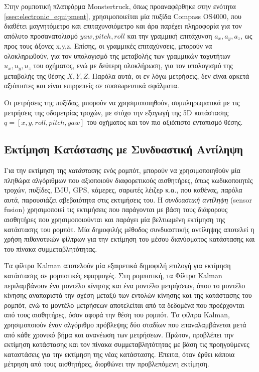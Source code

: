 \bigskip
Στην ρομποτική πλατφόρμα {Monstertruck}, όπως προαναφέρθηκε στην ενότητα \ref{ssec:electronic_equipment}, χρησιμοποιείται μία πυξίδα {Compass OS4000}, που διαθέτει μαγνητόμετρο και επιταχυνσιόμετρο και άρα παρέχει πληροφορία για τον απόλυτο προσανατολισμό $yaw, pitch, roll$ και την γραμμική επιτάχυνση $a_x, a_y, a_z$, ως προς τους άξονες x,y,z. Επίσης, οι γραμμικές επιταχύνσεις, μπορούν να ολοκληρωθούν, για τον υπολογισμό της μεταβολής των γραμμικών ταχυτήτων $u_x, u_y, u_z$ του οχήματος, ενώ με δεύτερη ολοκλήρωση, για τον υπολογισμό της μεταβολής της θέσης $X, Y, Z$. Παρόλα αυτά, οι εν λόγω μετρήσεις, δεν είναι αρκετά αξιόπιστες και είναι επιρρεπείς σε συσσωρευτικά σφάλματα.

\bigskip
Οι μετρήσεις της πυξίδας, μπορούν να χρησιμοποιηθούν, συμπληρωματικά με τις μετρήσεις της {οδομετρίας τροχών}, με στόχο την εξαγωγή της 5D κατάστασης $q = [x, y, roll, pitch, yaw]$  του οχήματος και τον πιο αξιόπιστο εντοπισμό θέσης.

\bigskip
\subsection{Εκτίμηση Κατάστασης με Συνδυαστική Αντίληψη} 
\label{ssec:state_estimation_and_sensor_fusion}
Για την εκτίμηση της \textit{κατάστασης} ενός ρομπότ, μπορούν να χρησιμοποιηθούν μία πληθώρα αλγόριθμων που αξιοποιούν διαφορετικούς αισθητήρες, όπως κωδικοποιητές τροχών, πυξίδες, IMU, GPS, κάμερες, σαρωτές λέιζερ  κ.α., που καθένας, παρόλα αυτά, παρουσιάζει αβεβαιότητα στις εκτιμήσεις του. Η \textit{συνδυαστική αντίληψη} ({sensor fusion}) χρησιμοποιεί τις εκτιμήσεις που παράγονται με βάση τους διάφορους αισθητήρες που χρησιμοποιούνται και παράγει μία βελτιωμένη εκτίμηση της κατάστασης του ρομπότ. Μία δημοφιλής μέθοδος συνδυαστικής αντίληψης αποτελεί η χρήση πιθανοτικών φίλτρων για την εκτίμηση του μέσου διανύσματος κατάστασης και του πίνακα συμμεταβλητότητας.

\bigskip
Τα φίλτρα Kalman αποτελούν μία εξαιρετικά δημοφιλή επιλογή για εκτίμηση κατάστασης σε ρομποτικές εφαρμογές. Στη ρομποτική, τα {Φίλτρα Kalman} περιλαμβάνουν ένα μοντέλο κίνησης και ένα μοντέλο μετρήσεων, όπου το μοντέλο κίνησης αναπαριστά την σχέση μεταξύ των εντολών κίνησης και της κατάστασης του ρομπότ, ενώ το μοντέλο μετρήσεων αποτελείται από τα δεδομένα που προέρχονται από τους αισθητήρες, όσον αφορά την θέση του ρομπότ. Τα φίλτρα Kalman, χρησιμοποιούν έναν αλγόριθμο πρόβλεψης δύο σταδίων που επαναλαμβάνεται μετά από κάθε χρονικό βήμα και ανανέωση των μετρήσεων. Πρώτον, προβλέπει την εκτίμηση κατάστασης και τον πίνακα συμμεταβλητότητας με βάση τις προηγούμενες καταστάσεις για την εκτίμηση της νέας κατάστασης. Έπειτα, όταν έρθει κάποια μέτρηση από τους αισθητήρες, διορθώνει την προβλεπόμενη εκτίμηση.

